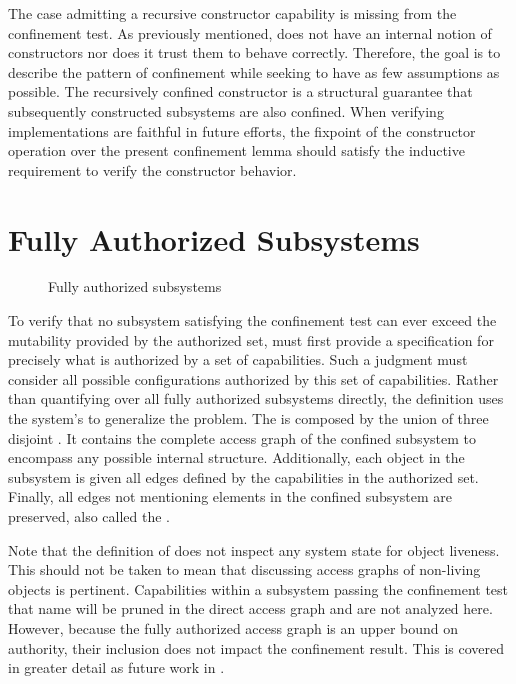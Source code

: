 The case admitting a recursive constructor capability is missing from the \TMmodelName{} confinement test.
As previously mentioned, \TMmodelName{} does not have an internal notion of constructors nor does it trust them to behave correctly.
Therefore, the goal is to describe the pattern of confinement while seeking to have as few assumptions as possible.
The recursively confined constructor is a structural guarantee that subsequently constructed subsystems are also confined.
When verifying implementations are faithful in future efforts, the fixpoint of the constructor operation over the present confinement lemma should satisfy the inductive requirement to verify the constructor behavior.

\section{Fully Authorized Subsystems}

\begin{figure}
  \COQDOCexistsCapEdge
  \COQDOCagRemainder
  \COQDOCagAuthorizedSrc
  \COQDOCagAuthorized
  \COQDOCagFullyAuthroized
  \caption{Fully authorized subsystems}
\end{figure}



To verify that no subsystem satisfying the confinement test can ever exceed the mutability provided by the authorized set, \TMmodelName{} must first provide a specification for precisely what is authorized by a set of capabilities.
Such a judgment must consider all possible \TMsubsystem{} configurations authorized by this set of capabilities.
Rather than quantifying over all fully authorized subsystems directly, the definition uses the system's \TMdirAccAG{} to generalize the problem.
The \term{\TMagFullyAuthorized} is composed by the union of three disjoint \TMaccessGraphs{}.
It contains the complete access graph of the confined subsystem to encompass any possible internal structure.
Additionally, each object in the subsystem is given all edges defined by the capabilities in the authorized set.
Finally, all edges not mentioning elements in the confined subsystem are preserved, also called the \term{\TMagRemainder{}}.

Note that the definition of  does not inspect any system state for object liveness.
This should not be taken to mean that discussing access graphs of non-living objects is pertinent.
Capabilities within a subsystem passing the confinement test that name \COQdead{} \TMobjs{} will be pruned in the direct access graph and are not analyzed here.
However, because the fully authorized access graph is an upper bound on authority, their inclusion does not impact the confinement result.
This is covered in greater detail as future work in .

